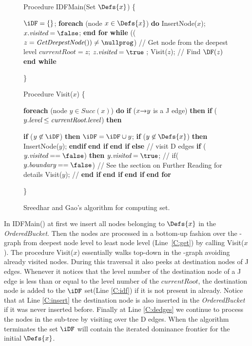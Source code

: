 {\begin{figure}[!ht]
\begin{minipage}[t]{5in}
Procedure IDFMain(Set $\Defs{x}$) 
\{
\begin{code}
 $\iDF = \{ \}$;
 {\bf foreach} (node $x \in  \Defs{x}$) {\bf do}
    InsertNode($x$);
    $x.\textit{visited} = \false $;
 {\bf end for}
 {\bf while} (($z = \textit{GetDeepestNode}()) \neq \nullprog$)  \label{C:get} // Get node from the deepest level
   $\textit{currentRoot} = z$;
  $z.\textit{visited} = \true$ ;
   Visit($z$);  // Find $\DF(z)$
 {\bf end while}
\end{code}
\} 

Procedure Visit($x$)
\{
\begin{code}
   {\bf foreach} (node $y \in \textit{Succ}(x)$) {\bf do}
  {\bf if} ($x \st{} y$ is a  J edge) {\bf then}
   {\bf if} ($y.\textit{level} \leq \textit{currentRoot}.\textit{level}$) {\bf then}

     {\bf if} ($y \not \in \iDF$) {\bf then}
        $\iDF = \iDF \cup {y}$;   \label{C:idf}
        {\bf if} ($y \not  \in \Defs{x}$) {\bf then}
          InsertNode($y$); \label{C:insert}
        {\bf endif}
     {\bf end if}
  {\bf end if}
 {\bf else} // visit D edges 
   {\bf if} ($y.\textit{visited} == \false $) {\bf then}
    $y.\textit{visited} = \true$;
    // if($y.\textit{boundary} == \false$)   \label{C:cached} // See the section on Further Reading for details
     Visit($y$); \label{C:dedges}
 // {\bf end if}
   {\bf end if}
  {\bf end if}
 {\bf end for}
\end{code}
\} 
\end{minipage}
\caption{Sreedhar and Gao's algorithm for computing \iDF set.}
\label{F:IDFMain}
\end{figure}

In IDFMain() at first we insert all nodes belonging to $\Defs{x}$ in the 
\textit{OrderedBucket}. Then the nodes are processed
in a bottom-up fashion over the \DJ-graph from deepest node level to least node level
(Line~\ref{C:get}) by calling Visit($x$). The procedure Visit($x$) essentially 
walks top-down in the  \DJ-graph avoiding already visited nodes. During this 
traversal it also peeks at destination nodes of J edges. Whenever it notices 
that the level number of the destination node of a J edge is less than or equal 
to the level number of the $\textit{currentRoot}$, the destination node is added to the $\iDF$ set(Line \ref{C:idf}) if it is not present in \iDF already. Notice that at Line \ref{C:insert} the destination node is also inserted in the {\it OrderedBucket} if it was never inserted before. Finally at Line \ref{C:dedges} we continue to process the nodes in the sub-tree by visiting over the D edges. When the algorithm terminates the 
set $\iDF$ will contain the iterated dominance frontier for the initial $\Defs{x}$.

}
